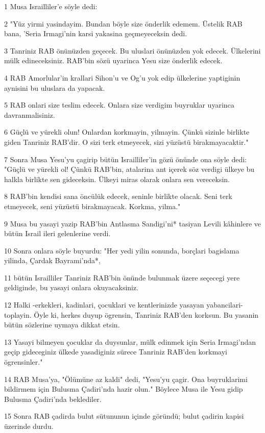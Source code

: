 \par 1 Musa Israilliler'e söyle dedi:
\par 2 "Yüz yirmi yasindayim. Bundan böyle size önderlik edemem. Üstelik RAB bana, 'Seria Irmagi'nin karsi yakasina geçmeyeceksin dedi.
\par 3 Tanriniz RAB önünüzden geçecek. Bu uluslari önünüzden yok edecek. Ülkelerini mülk edineceksiniz. RAB'bin sözü uyarinca Yesu size önderlik edecek.
\par 4 RAB Amorlular'in krallari Sihon'u ve Og'u yok edip ülkelerine yaptiginin aynisini bu uluslara da yapacak.
\par 5 RAB onlari size teslim edecek. Onlara size verdigim buyruklar uyarinca davranmalisiniz.
\par 6 Güçlü ve yürekli olun! Onlardan korkmayin, yilmayin. Çünkü sizinle birlikte giden Tanriniz RAB'dir. O sizi terk etmeyecek, sizi yüzüstü birakmayacaktir."
\par 7 Sonra Musa Yesu'yu çagirip bütün Israilliler'in gözü önünde ona söyle dedi: "Güçlü ve yürekli ol! Çünkü RAB'bin, atalarina ant içerek söz verdigi ülkeye bu halkla birlikte sen gideceksin. Ülkeyi miras olarak onlara sen vereceksin.
\par 8 RAB'bin kendisi sana öncülük edecek, seninle birlikte olacak. Seni terk etmeyecek, seni yüzüstü birakmayacak. Korkma, yilma."
\par 9 Musa bu yasayi yazip RAB'bin Antlasma Sandigi'ni* tasiyan Levili kâhinlere ve bütün Israil ileri gelenlerine verdi.
\par 10 Sonra onlara söyle buyurdu: "Her yedi yilin sonunda, borçlari bagislama yilinda, Çardak Bayrami'nda*,
\par 11 bütün Israilliler Tanriniz RAB'bin önünde bulunmak üzere seçecegi yere geldiginde, bu yasayi onlara okuyacaksiniz.
\par 12 Halki -erkekleri, kadinlari, çocuklari ve kentlerinizde yasayan yabancilari- toplayin. Öyle ki, herkes duyup ögrensin, Tanriniz RAB'den korksun. Bu yasanin bütün sözlerine uymaya dikkat etsin.
\par 13 Yasayi bilmeyen çocuklar da duysunlar, mülk edinmek için Seria Irmagi'ndan geçip gideceginiz ülkede yasadiginiz sürece Tanriniz RAB'den korkmayi ögrensinler."
\par 14 RAB Musa'ya, "Ölümüne az kaldi" dedi, "Yesu'yu çagir. Ona buyruklarimi bildirmem için Bulusma Çadiri'nda hazir olun." Böylece Musa ile Yesu gidip Bulusma Çadiri'nda beklediler.
\par 15 Sonra RAB çadirda bulut sütununun içinde göründü; bulut çadirin kapisi üzerinde durdu.
